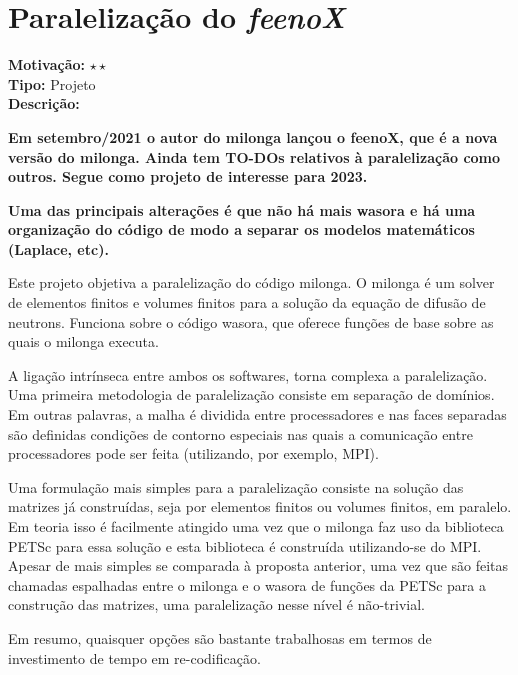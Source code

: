 \chapter{Paralelização do \textit{feenoX}}

\textbf{Motivação:} $\star\star$\\

\textbf{Tipo:} Projeto\\

\textbf{Descrição:}

\textbf{Em setembro/2021 o autor do milonga lançou o feenoX, que é a nova
  versão do milonga. Ainda tem TO-DOs relativos à paralelização como outros.
  Segue como projeto de interesse para 2023.}

\textbf{Uma das principais alterações é que não há mais wasora e há uma organização
  do código de modo a separar os modelos matemáticos (Laplace, etc).}

Este projeto objetiva a paralelização do código milonga. O milonga é um solver 
de elementos finitos e volumes finitos para a solução da equação de difusão de 
neutrons. Funciona sobre o código wasora, que oferece funções de base sobre as 
quais o milonga executa.

A ligação intrínseca entre ambos os softwares, torna complexa a paralelização. 
Uma primeira metodologia de paralelização consiste em separação de domínios. 
Em outras palavras, a malha é dividida entre processadores e nas faces separadas 
são definidas condições de contorno especiais nas quais a comunicação entre 
processadores pode ser feita (utilizando, por exemplo, MPI).

Uma formulação mais simples para a paralelização consiste na solução das matrizes 
já construídas, seja por elementos finitos ou volumes finitos, em paralelo. Em 
teoria isso é facilmente atingido uma vez que o milonga faz uso da biblioteca 
PETSc para essa solução e esta biblioteca é construída utilizando-se do MPI. 
Apesar de mais simples se comparada à proposta anterior, uma vez que são feitas 
chamadas espalhadas entre o milonga e o wasora de funções da PETSc para a construção das matrizes, uma paralelização nesse nível é não-trivial.

Em resumo, quaisquer opções são bastante trabalhosas em termos de investimento 
de tempo em re-codificação.

